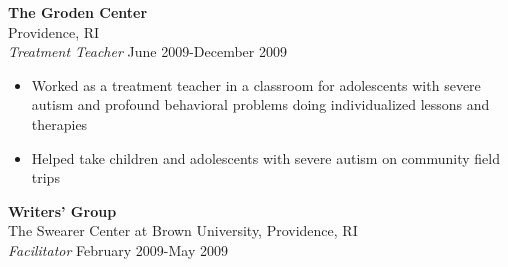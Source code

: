 \documentclass[line,margin,10pt]{res}
\begin{document}
\begin{resume}

\textbf{The Groden Center}\\
Providence, RI\\
{\sl Treatment Teacher} \hfill June 2009-December 2009 
               
              \begin{itemize}  \itemsep -2pt %
           \item Worked as a treatment teacher in a classroom for adolescents with severe autism and profound behavioral problems doing individualized lessons and therapies
       \item   Helped take children and adolescents with severe autism on community field trips                 \end{itemize}
\textbf{Writers' Group}\\
The Swearer Center at Brown University, Providence, RI\\
          {\sl Facilitator} \hfill            February 2009-May 2009 
              

\end{resume}
\end{document}
